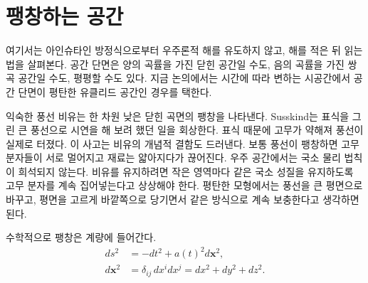 \begin{classroomqa}
\end{classroomqa}

\begin{classroomqa}
\end{classroomqa}

\section{팽창하는 공간}

여기서는 아인슈타인 방정식으로부터 우주론적 해를 유도하지 않고, 해를 적은 뒤 읽는 법을 살펴본다. 공간 단면은 양의 곡률을 가진 닫힌 공간일 수도, 음의 곡률을 가진 쌍곡 공간일 수도, 평평할 수도 있다. 지금 논의에서는 시간에 따라 변하는 시공간에서 공간 단면이 평탄한 유클리드 공간인 경우를 택한다.

\begin{classroomqa}
\end{classroomqa}

익숙한 풍선 비유는 한 차원 낮은 닫힌 곡면의 팽창을 나타낸다. Susskind는 표식을 그린 큰 풍선으로 시연을 해 보려 했던 일을 회상한다. 표식 때문에 고무가 약해져 풍선이 실제로 터졌다. 이 사고는 비유의 개념적 결함도 드러낸다. 보통 풍선이 팽창하면 고무 분자들이 서로 멀어지고 재료는 얇아지다가 끊어진다. 우주 공간에서는 국소 물리 법칙이 희석되지 않는다. 비유를 유지하려면 작은 영역마다 같은 국소 성질을 유지하도록 고무 분자를 계속 집어넣는다고 상상해야 한다. 평탄한 모형에서는 풍선을 큰 평면으로 바꾸고, 평면을 고르게 바깥쪽으로 당기면서 같은 방식으로 계속 보충한다고 생각하면 된다.

수학적으로 팽창은 계량에 들어간다.
\begin{equation}
\begin{aligned}
ds^2&=-dt^2+a(t)^2d\mathbf{x}^2,\\
d\mathbf{x}^2&=\delta_{ij}\,dx^i dx^j
=dx^2+dy^2+dz^2.
\end{aligned}
\label{eq:l07-frw-metric}
\end{equation}

